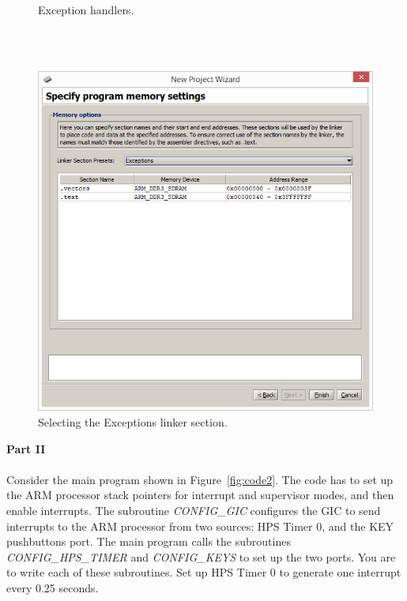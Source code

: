 \documentclass[epsfig,10pt,fullpage]{article}
\begin{document}
\begin{figure}[H]
\begin{center}
\begin{minipage}[t]{17.5 cm}

\end{minipage}
\end{center}
\caption{Exception handlers.}
\label{fig:handlers}
\end{figure}
~\\
~\\
\begin{figure}[htb]
	\begin{center}
	\includegraphics[scale=0.58]{figures/exceptions.png}
	\end{center}
	\vspace{-0.25cm}\caption{Selecting the {\sf Exceptions} linker section.}
\label{fig:exceptions}
\end{figure}

\newpage
\noindent
{\bf Part II}
~\\
~\\
\noindent
Consider the main program shown in Figure~\ref{fig:code2}. The code has to set up 
the ARM processor stack pointers for interrupt and supervisor modes, and then enable interrupts.
The subroutine {\it CONFIG\_GIC} configures the GIC to send interrupts to the ARM processor from
two sources: HPS Timer 0, and the KEY pushbuttons port. The main program calls the
subroutines {\it CONFIG\_HPS\_TIMER} and {\it CONFIG\_KEYS} to set up the two ports. You
are to write each of these subroutines. Set up HPS Timer 0 to generate one interrupt
every 0.25 seconds.
\end{document}
